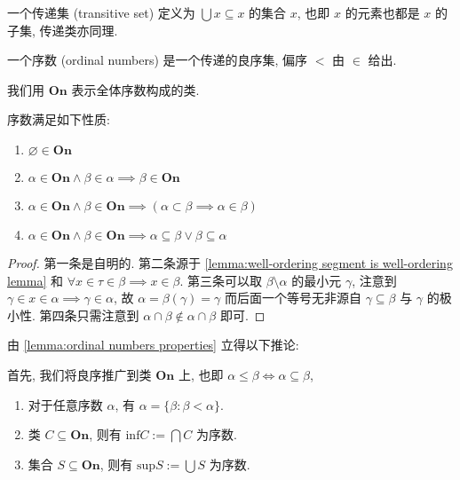 \begin{definition}
    一个传递集 (transitive set) 定义为 \(\bigcup x \subseteq x\) 的集合 \(x\), 也即 \(x\) 的元素也都是 \(x\) 的子集, 传递类亦同理.
\end{definition}

\begin{definition}
    \label{definition:ordinal}
    一个序数 (ordinal numbers) 是一个传递的良序集, 偏序 \(<\) 由 \(\in\) 给出.
\end{definition}

我们用 \(\mathbf{On}\) 表示全体序数构成的类.

\begin{lemma}
    \label{lemma:ordinal numbers properties}
    序数满足如下性质:

    \begin{enumerate}
        \item \(\varnothing \in \mathbf{On}\) 
        \item \(\alpha \in \mathbf{On} \land \beta \in \alpha \implies \beta \in \mathbf{On}\)
        \item \(\alpha \in \mathbf{On} \land \beta \in \mathbf{On} \implies (\alpha \subset \beta \implies \alpha \in \beta)\)
        \item \(\alpha \in \mathbf{On} \land \beta \in \mathbf{On} \implies \alpha \subseteq \beta \lor \beta \subseteq \alpha\)
    \end{enumerate}

    \begin{proof}
        第一条是自明的. 第二条源于 \ref{lemma:well-ordering segment is well-ordering lemma} 和
        \(\forall x \in \tau \in \beta \implies x \in \beta\). 第三条可以取 \(\beta \setminus \alpha\) 的最小元 \(\gamma\),
        注意到 \(\gamma \in x \in \alpha \implies \gamma \in \alpha\), 故 \(\alpha = \beta(\gamma) = \gamma\) 而后面一个等号无非源自 \(\gamma \subseteq \beta\) 与 \(\gamma\) 的极小性.
        第四条只需注意到 \(\alpha \cap \beta \notin \alpha \cap \beta\) 即可.
    \end{proof}
\end{lemma}

由 \ref{lemma:ordinal numbers properties} 立得以下推论:

\begin{corollary}
    \label{corollary:ordinal numbers properties}
    首先, 我们将良序推广到类 \(\mathbf{On}\) 上, 也即 \(\alpha \le \beta \iff \alpha \subseteq \beta\),

    \begin{enumerate}
        \item 对于任意序数 \(\alpha\), 有 \(\alpha = \{\beta : \beta < \alpha\}\).
        \item 类 \(C \subseteq \mathbf{On}\), 则有 \(\mathrm{inf} C := \bigcap C\) 为序数.
        \item 集合 \(S \subseteq \mathbf{On}\), 则有 \(\mathrm{sup} S := \bigcup S\) 为序数.
    \end{enumerate}
\end{corollary}

